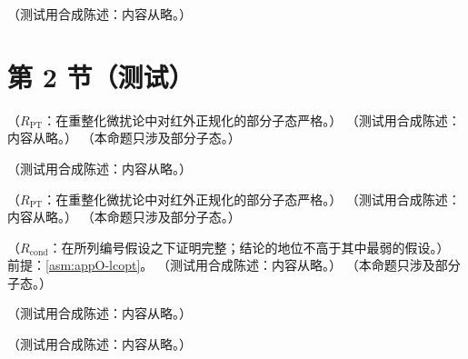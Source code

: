 \begin{definition}\label{def:appO-orientation}
（测试用合成陈述：内容从略。）
\end{definition}

\section{第 2 节（测试）}\label{sec:appO-lcopt}

\begin{lemma}\label{lem:appO-orientation}
（$R_{\mathrm{PT}}$：在重整化微扰论中对红外正规化的部分子态严格。）
（测试用合成陈述：内容从略。）
（本命题只涉及部分子态。）
\end{lemma}

\begin{definition}\label{def:appO-pinch}
（测试用合成陈述：内容从略。）
\end{definition}

\begin{lemma}\label{lem:appO-glauber-pc}
（$R_{\mathrm{PT}}$：在重整化微扰论中对红外正规化的部分子态严格。）
（测试用合成陈述：内容从略。）
（本命题只涉及部分子态。）
\end{lemma}

\begin{lemma}\label{lem:appO-hard-locality}
（$R_{\mathrm{cond}}$：在所列编号假设之下证明完整；结论的地位不高于其中最弱的假设。）
前提：\cref{asm:appO-lcopt}。
（测试用合成陈述：内容从略。）
（本命题只涉及部分子态。）
\end{lemma}

\begin{definition}\label{def:appO-chain}
（测试用合成陈述：内容从略。）
\end{definition}

\begin{lemma}\label{lem:appO-cut-position}
（测试用合成陈述：内容从略。）
\end{lemma}

